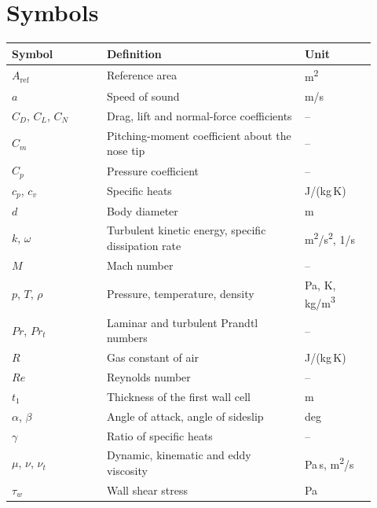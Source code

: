 \section{Symbols}

\begin{longtable}{@{}P{0.24\linewidth} P{0.50\linewidth} P{0.18\linewidth}@{}}
\toprule
Symbol & Definition & Unit \\
\midrule
\endhead
$A_\text{ref}$ & Reference area & m\textsuperscript{2} \\
$a$ & Speed of sound & m/s \\
$C_D$, $C_L$, $C_N$ & Drag, lift and normal-force coefficients & -- \\
$C_m$ & Pitching-moment coefficient about the nose tip & -- \\
$C_p$ & Pressure coefficient & -- \\
$c_p$, $c_v$ & Specific heats & J/(kg\,K) \\
$d$ & Body diameter & m \\
$k$, $\omega$ & Turbulent kinetic energy, specific dissipation rate & m\textsuperscript{2}/s\textsuperscript{2}, 1/s \\
$M$ & Mach number & -- \\
$p$, $T$, $\rho$ & Pressure, temperature, density & Pa, K, kg/m\textsuperscript{3} \\
$Pr$, $Pr_t$ & Laminar and turbulent Prandtl numbers & -- \\
$R$ & Gas constant of air & J/(kg\,K) \\
$Re$ & Reynolds number & -- \\
$t_1$ & Thickness of the first wall cell & m \\
$\alpha$, $\beta$ & Angle of attack, angle of sideslip & deg \\
$\gamma$ & Ratio of specific heats & -- \\
$\mu$, $\nu$, $\nu_t$ & Dynamic, kinematic and eddy viscosity & Pa\,s, m\textsuperscript{2}/s \\
$\tau_w$ & Wall shear stress & Pa \\
\bottomrule
\end{longtable}
